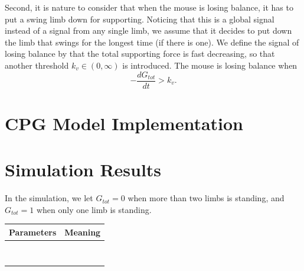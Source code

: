 \documentclass[11pt]{article}
\newcommand{\GT}{G_{tot}}
\begin{document}
Second, it is nature to consider that when the mouse is losing balance, it has to put a swing limb down for supporting. Noticing that this is a global signal instead of a signal from any single limb, we assume that it decides to put down the limb that swings for the longest time (if there is one). We define the signal of losing balance by that the total supporting force is fast decreasing, so that another threshold $ k_v\in(0,\infty) $ is introduced. The mouse is losing balance when
\begin{equation}
	-\frac{d\GT}{dt}>k_v.
\end{equation}



\section{CPG Model Implementation}\label{chap:CPG}



\section{Simulation Results}\label{chap:simulation}

In the simulation, we let $ G_{tot} = 0 $ when more than two limbs is standing, and $ G_{tot} = 1 $ when only one limb is standing.



\newpage

\begin{tabular}{|c|l|}
	\hline
	\multicolumn{1}{|c|}{Parameters} & \multicolumn{1}{|c|}{Meaning} \\
	\hline
	&  \\
	\hline
	&  \\
	\hline
	&  \\
	\hline
	&  \\
	\hline
	&  \\
	\hline
	&  \\
	\hline
	&  \\
	\hline
	&  \\
	\hline
\end{tabular}




\end{document}
